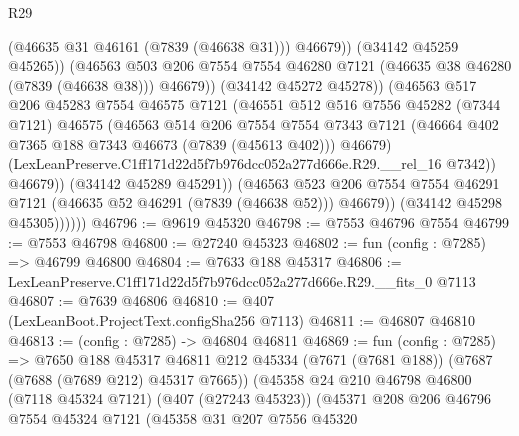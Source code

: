 \begin{lexlean}{R29}
\begin{coremodule}
                              (@46635 @31 @46161 (@7839 (@46638 @31)))
                              @46679))
                          (@34142 @45259 @45265))
                        (@46563
                          @503
                          @206
                          @7554
                          @7554
                          @46280
                          @7121
                          (@46635 @38 @46280 (@7839 (@46638 @38)))
                          @46679))
                      (@34142 @45272 @45278))
                    (@46563
                      @517
                      @206
                      @45283
                      @7554
                      @46575
                      @7121
                      (@46551
                        @512
                        @516
                        @7556
                        @45282
                        (@7344 @7121)
                        @46575
                        (@46563
                          @514
                          @206
                          @7554
                          @7554
                          @7343
                          @7121
                          (@46664 @402 @7365 @188 @7343 @46673 (@7839 (@45613 @402)))
                          @46679)
                        (LexLeanPreserve.C1ff171d22d5f7b976dcc052a277d666e.R29.__rel_16 @7342))
                      @46679))
                  (@34142 @45289 @45291))
                (@46563
                  @523
                  @206
                  @7554
                  @7554
                  @46291
                  @7121
                  (@46635 @52 @46291 (@7839 (@46638 @52)))
                  @46679))
              (@34142 @45298 @45305))))))
@46796 := @9619 @45320
@46798 := @7553 @46796 @7554
@46799 := @7553 @46798
@46800 := @27240 @45323
@46802 := fun (config : @7285) => @46799 @46800
@46804 := @7633 @188 @45317
@46806 := LexLeanPreserve.C1ff171d22d5f7b976dcc052a277d666e.R29.__fits_0 @7113
@46807 := @7639 @46806
@46810 := @407 (LexLeanBoot.ProjectText.configSha256 @7113)
@46811 := @46807 @46810
@46813 := (config : @7285) -> @46804 @46811
@46869 := fun (config : @7285) =>
  @7650
    @188
    @45317
    @46811
    @212
    @45334
    (@7671 (@7681 @188))
    (@7687 (@7688 (@7689 @212) @45317 @7665))
    (@45358
      @24
      @210
      @46798
      @46800
      (@7118 @45324 @7121)
      (@407 (@27243 @45323))
      (@45371
        @208
        @206
        @46796
        @7554
        @45324
        @7121
        (@45358
          @31
          @207
          @7556
          @45320

\end{coremodule}
\end{lexlean}
